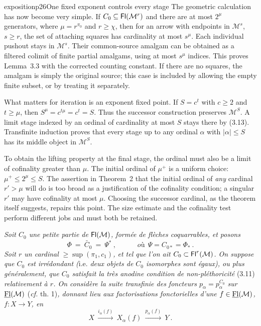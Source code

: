 \begin{dcomment}{exposition}{p26}{One fixed exponent controls every stage}
The geometric calculation has now become very simple. If $C_0\subseteq\mathsf{Fl}(\mathcal M^r)$ and there are at most $2^\mu$ generators, where $\mu=r^{\pi_0}$ and $r\geq\chi$, then for an arrow with endpoints in $\mathcal M^s$, $s\geq r$, the set of attaching squares has cardinality at most $s^\mu$. Each individual pushout stays in $\mathcal M^s$. Their common-source amalgam can be obtained as a filtered colimit of finite partial amalgams, using at most $s^\mu$ indices. This proves Lemma~3.3 with the corrected counting constant. If there are no squares, the amalgam is simply the original source; this case is included by allowing the empty finite subset, or by treating it separately.

What matters for iteration is an exponent fixed point. If $S=c^t$ with $c\geq2$ and $t\geq\mu$, then $S^\mu=c^{t\mu}=c^t=S$. Thus the successor construction preserves $\mathcal M^S$. A limit stage indexed by an ordinal of cardinality at most $S$ stays there by (3.13). Transfinite induction proves that every stage up to any ordinal $\alpha$ with $|\alpha|\leq S$ has its middle object in $\mathcal M^S$.

To obtain the lifting property at the final stage, the ordinal must also be a limit of cofinality greater than $\mu$. The initial ordinal of $\mu^+$ is a uniform choice: $\mu^+\leq2^\mu\leq S$. The assertion in Theorem~2 that the initial ordinal of \emph{any} cardinal $r'>\mu$ will do is too broad as a justification of the cofinality condition; a singular $r'$ may have cofinality at most $\mu$. Choosing the successor cardinal, as the theorem itself suggests, repairs this point. The size estimate and the cofinality test perform different jobs and must both be retained.
\end{dcomment}


\textit{Soit $C_0$ une petite partie de} $\mathsf{Fl}(\mathcal{M})$\textit{, formée de flèches coquarrables, et posons}
\[
\Phi\ =\ \widetilde{C_0}\ =\ \Psi^*\ ,\qquad\quad\textit{où}\ \ \Psi=C_{0*}=\Phi_*\ .
\]
\textit{Soit $r$ un cardinal} $\geq\sup(\pi_1,c_1)$\textit{, et tel que l'on ait $C_0\subset\mathsf{Fl}^r(\mathcal{M})$. On suppose que $C_0$ est irrédondant (}i.e.\textit{ deux objets de $C_0$ isomorphes sont égaux), ou plus généralement, que $C_0$ satisfait la très anodine condition de non-pléthoricité} \textup{(3.11)} \textit{relativement à $r$. On considère la suite transfinie des foncteurs $p_\alpha=p_\alpha^{C_0}$ sur $\underline{\mathrm{Fl}}(\mathcal{M})$} \textup{(}\textit{cf.} \textup{th. 1)}\textit{, donnant lieu aux factorisations fonctorielles d'une $f\in\underline{\mathrm{Fl}}(\mathcal{M})$, $f:X\longrightarrow Y$, en}
\[
X\ \xrightarrow{i_\alpha(f)}\ X_\alpha(f)\ \xrightarrow{p_\alpha(f)}\ Y\ . \tag*{(3.16)}
\]

